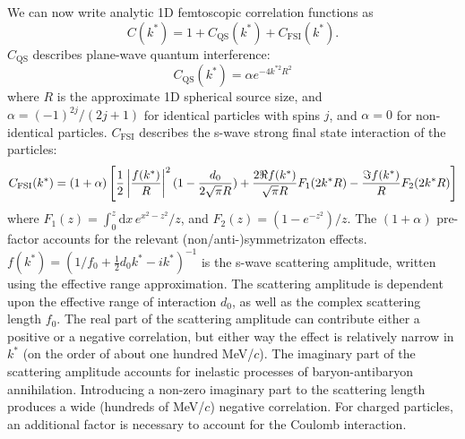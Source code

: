 We can now write analytic 1D femtoscopic correlation functions as
\begin{equation}
\label{eq:GeneralCorrelationFunction}
C(k^*)= 1 + C_{\mathrm{QS}}(k^*)+C_{\mathrm{FSI}}(k^*).
\end{equation}
$C_{\mathrm{QS}}$ describes plane-wave quantum interference:
\begin{equation}
C_{\mathrm{QS}}(k^*) = \alpha e^{-4k^{*2}R^2}
\end{equation}
where $R$ is the approximate 1D spherical source size, and $\alpha = (-1)^{2j}/(2j+1)$ for identical particles with spins $j$, and $\alpha = 0$ for non-identical particles.
$C_{\mathrm{FSI}}$ describes the s-wave strong final state interaction of the particles:
\begin{equation}
\label{eq:Lednicky}
C_{\mathrm{FSI}}(k^*)= (1+\alpha)\left[\frac{1}{2}\left\lvert\frac{f(k^*)}{R}\right\rvert^2(1-\frac{d_0}{2\sqrt{\pi}R})+\frac{2\Re f(k^*)}{\sqrt{\pi}R}F_1(2k^*R)-\frac{\Im f(k^*)}{R}F_2(2k^*R)\right]
\end{equation}
where $F_1(z) = \int_0^z \! \mathrm{d}x \, e^{x^2-z^2}/z$, and $F_2(z) = (1-e^{-z^2})/z$.
The $(1+\alpha)$ pre-factor accounts for the relevant (non/anti-)symmetrizaton effects.
$f(k^*)=(1/f_0+\frac{1}{2}d_0k^*-ik^*)^{-1}$ is the s-wave scattering amplitude, written using the effective range approximation.
The scattering amplitude is dependent upon the effective range of interaction $d_0$, as well as the complex scattering length $f_0$.  
The real part of the scattering amplitude can contribute either a positive or a negative correlation, but either way the effect is relatively narrow in $k^*$ (on the order of about one hundred MeV/$c$).  
The imaginary part of the scattering amplitude accounts for inelastic processes of baryon-antibaryon annihilation.  
Introducing a non-zero imaginary part to the scattering length produces a wide (hundreds of MeV/$c$) negative correlation.  
For charged particles, an additional factor \cite{Aamodt:2011kd} is necessary to account for the Coulomb interaction.

